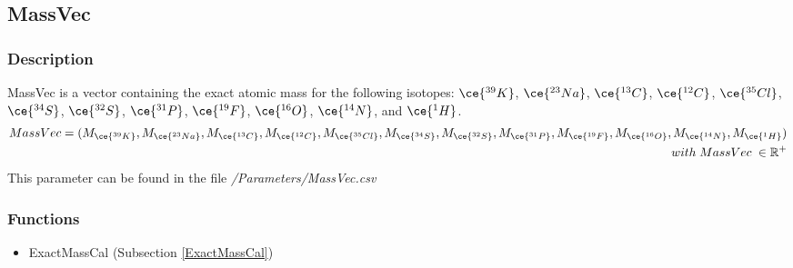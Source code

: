 \subsection{MassVec}\label{MassVec}
\subsubsection{Description}
MassVec is a vector containing the exact atomic mass for the following isotopes: $\ce{^{39}K}$, $\ce{^{23}Na}$, $\ce{^{13}C}$, $\ce{^{12}C}$, $\ce{^{35}Cl}$, $\ce{^{34}S}$, $\ce{^{32}S}$, $\ce{^{31}P}$, $\ce{^{19}F}$, $\ce{^{16}O}$, $\ce{^{14}N}$, and $\ce{^{1}H}$.
\begin{equation}
\begin{split}
MassVec=(M_{\ce{^{39}K}}, M_{\ce{^{23}Na}}, M_{\ce{^{13}C}}, M_{\ce{^{12}C}}, M_{\ce{^{35}Cl}}, M_{\ce{^{34}S}}, M_{\ce{^{32}S}}, M_{\ce{^{31}P}}, M_{\ce{^{19}F}}, M_{\ce{^{16}O}}, M_{\ce{^{14}N}}, M_{\ce{^{1}H}}) \\
\; with \; MassVec \;\in \mathbb{R}^{+}
\end{split}
\end{equation}
This parameter can be found in the file \textit{/Parameters/MassVec.csv}
\subsubsection{Functions}
\begin{itemize}
\item ExactMassCal (Subsection \ref{ExactMassCal})
\end{itemize}

